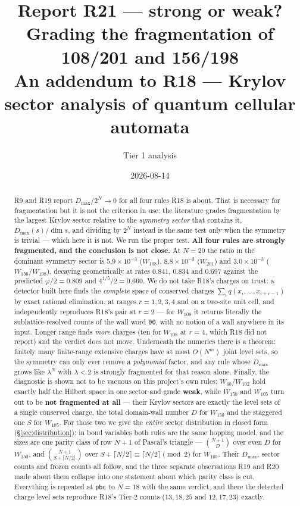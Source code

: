 \documentclass[11pt]{article}
\title{\textbf{Report R21 --- strong or weak? Grading the fragmentation of
108/201 and 156/198}\\
\large An addendum to R18 --- Krylov sector analysis of quantum cellular
automata}
\author{Tier 1 analysis}
\date{2026-08-14}
\newcommand{\rt}[1]{\texttt{#1}}
\theoremstyle{plain}
\begin{document}
\maketitle

\begin{abstract}
R9 and R19 report $D_{\max}/2^N \to 0$ for all four rules R18 is about. That is
necessary for fragmentation but it is not the criterion in use: the literature
grades fragmentation by the largest Krylov sector relative to the
\emph{symmetry sector} that contains it, $D_{\max}(s)/\dim s$, and dividing by
$2^N$ instead is the same test only when the symmetry is trivial --- which here
it is not. We run the proper test. \textbf{All four rules are strongly
fragmented, and the conclusion is not close.} At $N=20$ the ratio in the
dominant symmetry sector is $5.9\times10^{-3}$ ($W_{108}$),
$8.8\times10^{-3}$ ($W_{201}$) and $3.0\times10^{-3}$ ($W_{156}/W_{198}$),
decaying geometrically at rates $0.841$, $0.834$ and $0.697$ against the
predicted $\varphi/2 = 0.809$ and $4^{1/5}/2 = 0.660$. We do not take R18's
charges on trust: a detector built here finds the \emph{complete} space of
conserved charges $\sum_i q(x_i,\ldots,x_{i+r-1})$ by exact rational
elimination, at ranges $r=1,2,3,4$ and on a two-site unit cell, and
independently reproduces R18's pair at $r=2$ --- for $W_{108}$ it returns
literally the sublattice-resolved counts of the wall word \rt{00}, with no
notion of a wall anywhere in its input. Longer range finds \emph{more} charges
(ten for $W_{108}$ at $r=4$, which R18 did not report) and the verdict does not
move. Underneath the numerics there is a theorem: finitely many finite-range
extensive charges have at most $O(N^m)$ joint level sets, so the symmetry can
only ever remove a \emph{polynomial} factor, and any rule whose $D_{\max}$
grows like $\lambda^N$ with $\lambda<2$ is strongly fragmented for that reason
alone. Finally, the diagnostic is shown not to be vacuous on this project's own
rules: $W_{60}/W_{102}$ hold exactly half the Hilbert space in one sector and
grade \textbf{weak}, while $W_{150}$ and $W_{105}$ turn out to be
\textbf{not fragmented at all} --- their Krylov sectors are exactly the level
sets of a single conserved charge, the total domain-wall number $D$ for
$W_{150}$ and the staggered one $S$ for $W_{105}$. For those two we give the
\emph{entire} sector distribution in closed form
(\S\ref{sec:distribution}): in bond variables both rules are the same hopping
model, and the sizes are one parity class of row $N+1$ of Pascal's triangle ---
$\binom{N+1}{D}$ over even $D$ for $W_{150}$, and
$\binom{N+1}{S+\lceil N/2\rceil}$ over $S + \lceil N/2\rceil \equiv
\lceil N/2\rceil \pmod 2$ for $W_{105}$. Their $D_{\max}$, sector counts and
frozen counts all follow, and the three separate observations R19 and R20 made
about them collapse into one statement about which parity class is cut.
Everything is repeated at \rt{pbc} to $N=18$ with the same verdict, and there
the detected charge level sets reproduce R18's Tier-2 counts ($13,18,25$ and
$12,17,23$) exactly.
\end{abstract}
\end{document}
